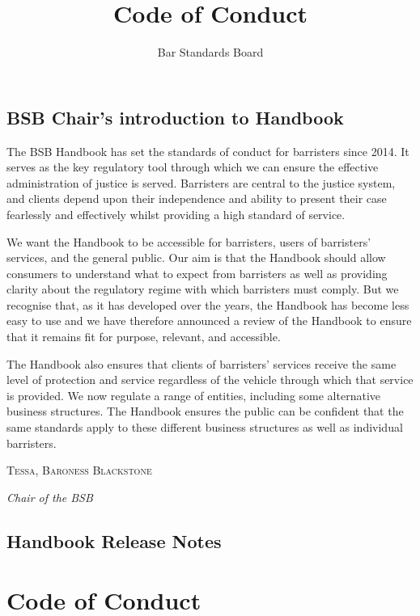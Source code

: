 \documentclass[a4paper,twoside]{memoir}
\title{Code of Conduct}
\author{Bar Standards Board}
\begin{document}

\cleartoverso
\frontmatter
\begin{KeepFromToc}
  \tableofcontents
\end{KeepFromToc}
\chapter{BSB Chair’s introduction to Handbook}

The BSB Handbook has set the standards of conduct for barristers since 2014. It serves as the key regulatory tool through which we can ensure the effective administration of justice is served. Barristers are central to the justice system, and clients depend upon their independence and ability to present their case fearlessly and effectively whilst providing a high standard of service.

We want the Handbook to be accessible for barristers, users of barristers’ services, and the general public. Our aim is that the Handbook should allow consumers to understand what to expect from barristers as well as providing clarity about the regulatory regime with which barristers must comply. But we recognise that, as it has developed over the years, the Handbook has become less easy to use and we have therefore announced a review of the Handbook to ensure that it remains fit for purpose, relevant, and accessible.

The Handbook also ensures that clients of barristers’ services receive the same level of protection and service regardless of the vehicle through which that service is provided. We now regulate a range of entities, including some alternative business structures. The Handbook ensures the public can be confident that the same standards apply to these different business structures as well as individual barristers.

\medskip
\hfill\scshape Tessa, Baroness Blackstone

\normalfont\hfill\itshape Chair of the BSB
\normalfont
\chapter{Handbook Release Notes}

\mainmatter

\part{Code of Conduct}	





\end{document}
